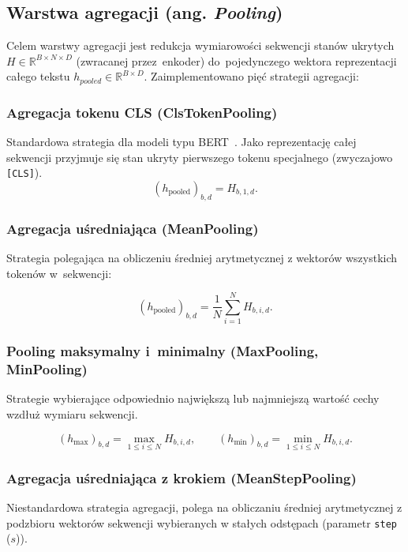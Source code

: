 \documentclass[a4paper,11pt,twoside]{report}
\theoremstyle{definition}
\begin{document}
\subsection{Warstwa agregacji (ang. \emph{Pooling})}

Celem warstwy agregacji jest redukcja wymiarowości sekwencji stanów ukrytych $H \in \mathbb{R}^{B \times N \times D}$ (zwracanej przez~enkoder) do~pojedynczego wektora reprezentacji całego tekstu $h_{pooled} \in \mathbb{R}^{B \times D}$. Zaimplementowano pięć strategii agregacji:



\subsubsection{Agregacja tokenu CLS (ClsTokenPooling)}
Standardowa strategia dla modeli typu BERT~\cite{devlin2019bert}. Jako reprezentację całej sekwencji przyjmuje się stan ukryty pierwszego tokenu specjalnego (zwyczajowo \texttt{[CLS]}).
\begin{equation}
(h_{\text{pooled}})_{b,d} = H_{b,1,d}.
\end{equation}
\subsubsection{Agregacja uśredniająca (MeanPooling)}
Strategia polegająca na obliczeniu średniej arytmetycznej z wektorów wszystkich tokenów w~sekwencji:

\begin{equation}
(h_{\text{pooled}})_{b,d}
=
\frac{1}{N}
\sum_{i=1}^{N} H_{b,i,d}.
\end{equation}

\subsubsection{Pooling maksymalny i~minimalny (MaxPooling, MinPooling)}
Strategie wybierające odpowiednio największą lub najmniejszą wartość cechy wzdłuż wymiaru sekwencji.

\begin{equation}
(h_{\max})_{b,d} = \max_{1\le i\le N} H_{b,i,d},
\qquad
(h_{\min})_{b,d} = \min_{1\le i\le N} H_{b,i,d}.
\end{equation}

\subsubsection{Agregacja uśredniająca z krokiem (MeanStepPooling)}
Niestandardowa strategia agregacji, polega na obliczaniu średniej arytmetycznej z podzbioru wektorów sekwencji wybieranych w stałych odstępach (parametr \texttt{step} ($s$)). 
\end{document}
